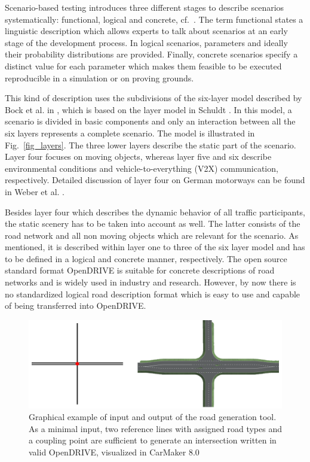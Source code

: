 \documentclass[a4paper, 10pt, conference]{ieeeconf}      %
\begin{document}
Scenario-based testing introduces three different stages to describe scenarios systematically: functional, logical and concrete, cf.~\cite{menzel2018scenarios}. The term functional states a linguistic description which allows experts to talk about scenarios at an early stage of the development process. In logical scenarios, parameters and ideally their probability distributions are provided. Finally, concrete scenarios specify a distinct value for each parameter which makes them feasible to be executed reproducible in a simulation or on proving grounds. 

This kind of description uses the subdivisions of the six-layer model described by Bock et al. in \cite{bock2018data}, which is based on the layer model in Schuldt \cite{schuldt2017beitrag}. In this model, a scenario is divided in basic components and only an interaction between all the six layers represents a complete scenario. The model is illustrated in Fig.~\ref{fig_layers}. The three lower layers describe the static part of the scenario. Layer four focuses on moving objects, whereas layer five and six describe environmental conditions and vehicle-to-everything (V2X) communication, respectively. Detailed discussion of layer four on German motorways can be found in Weber et al. \cite{weber2019framework}.

Besides layer four which describes the dynamic behavior of all traffic participants, the static scenery has to be taken into account as well. The latter consists of the road network and all non moving objects which are relevant for the scenario. As mentioned, it is described within layer one to three of the six layer model and has to be defined in a logical and concrete manner, respectively. The open source standard format OpenDRIVE \cite{odr1.5} is suitable for concrete descriptions of road networks and is widely used in industry and research. However, by now there is no standardized logical road description format which is easy to use and capable of being transferred into OpenDRIVE.
\begin{figure}[t] 		
	\centering
	\includegraphics{fig/motivation.png}
	\caption[dummy]{Graphical example of input and output of the road generation tool. As a minimal input, two reference lines with assigned road types and a coupling point are sufficient to generate an intersection written in valid OpenDRIVE, visualized in CarMaker 8.0\footnotemark}
	\label{fig_motivation}
\end{figure}
\end{document}
